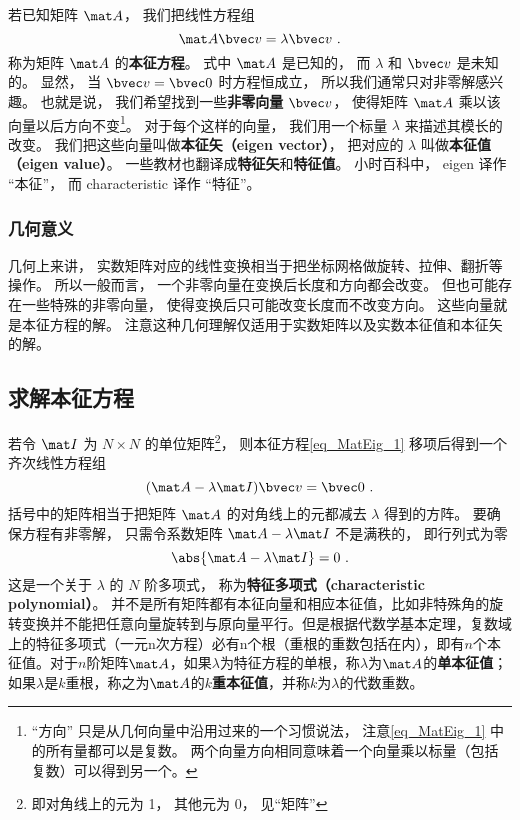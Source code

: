 

若已知矩阵 $\mat A$， 我们把线性方程组
\begin{equation}\label{eq_MatEig_1}
\mat A \bvec v = \lambda \bvec v~.
\end{equation}
称为矩阵 $\mat A$ 的\textbf{本征方程}。 式中 $\mat A$ 是已知的， 而 $\lambda$ 和 $\bvec v$ 是未知的。 显然， 当 $\bvec v = \bvec 0$ 时方程恒成立， 所以我们通常只对非零解感兴趣。 也就是说， 我们希望找到一些\textbf{非零向量} $\bvec v$， 使得矩阵 $\mat A$ 乘以该向量以后方向不变\footnote{“方向” 只是从几何向量中沿用过来的一个习惯说法， 注意\autoref{eq_MatEig_1} 中的所有量都可以是复数。 两个向量方向相同意味着一个向量乘以标量（包括复数）可以得到另一个。}。 对于每个这样的向量， 我们用一个标量 $\lambda$ 来描述其模长的改变。 我们把这些向量叫做\textbf{本征矢（eigen vector）}， 把对应的 $\lambda$ 叫做\textbf{本征值（eigen value）}。 一些教材也翻译成\textbf{特征矢}和\textbf{特征值}。 小时百科中， eigen 译作 “本征”， 而 characteristic 译作 “特征”。

\subsubsection{几何意义}
几何上来讲， 实数矩阵对应的线性变换相当于把坐标网格做旋转、拉伸、翻折等操作。%
所以一般而言， 一个非零向量在变换后长度和方向都会改变。 但也可能存在一些特殊的非零向量， 使得变换后只可能改变长度而不改变方向。 这些向量就是本征方程的解。 注意这种几何理解仅适用于实数矩阵以及实数本征值和本征矢的解。

\subsection{求解本征方程}\label{sub_MatEig_1}

若令 $\mat I$ 为 $N\times N$ 的单位矩阵\footnote{即对角线上的元为 1， 其他元为 0， 见“矩阵”}， 则本征方程\autoref{eq_MatEig_1} 移项后得到一个齐次线性方程组
\begin{equation}\label{eq_MatEig_2}
(\mat A - \lambda\mat I)\bvec v = \bvec 0~.
\end{equation}
括号中的矩阵相当于把矩阵 $\mat A$ 的对角线上的元都减去 $\lambda$ 得到的方阵。 要确保方程有非零解， 只需令系数矩阵 $\mat A - \lambda\mat I$ 不是满秩的， 即行列式为零
\begin{equation}\label{eq_MatEig_4}
\abs{\mat A - \lambda\mat I} = 0~.
\end{equation}
这是一个关于 $\lambda$ 的 $N$ 阶多项式， 称为\textbf{特征多项式（characteristic polynomial）}。 并不是所有矩阵都有本征向量和相应本征值，比如非特殊角的旋转变换并不能把任意向量旋转到与原向量平行。但是根据代数学基本定理，复数域上的特征多项式（一元n次方程）必有n个根（重根的重数包括在内），即有$n$个本征值。对于$n$阶矩阵$\mat A$，如果$\lambda$为特征方程的单根，称$\lambda$为$\mat A$的\textbf{单本征值}；如果$\lambda$是$k$重根，称之为$\mat A$的\textbf{$k$重本征值}，并称$k$为$\lambda$的代数重数。

